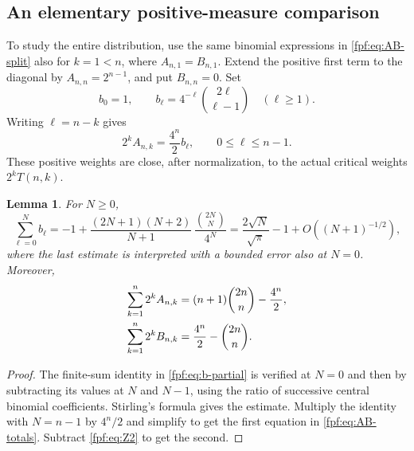 \documentclass[11pt]{article}
\numberwithin{equation}{section}
\newtheorem{lemma}[theorem]{Lemma}
\theoremstyle{definition}
\begin{document}
\subsection{An elementary positive-measure comparison}
To study the entire distribution, use the same binomial expressions in
\eqref{fpf:eq:AB-split} also for $k=1<n$, where $A_{n,1}=B_{n,1}$.
Extend the positive first term to the diagonal by
$A_{n,n}=2^{n-1}$, and put $B_{n,n}=0$. Set
\begin{equation}\label{fpf:eq:b-critical}
 b_0=1,\qquad b_\ell=4^{-\ell}\binom{2\ell}{\ell-1}\quad(\ell\ge1).
\end{equation}
Writing $\ell=n-k$ gives
\begin{equation}\label{fpf:eq:critical-positive}
 2^kA_{n,k}=\frac{4^n}{2}b_\ell,\qquad 0\le\ell\le n-1.
\end{equation}
These positive weights are close, after normalization, to the actual
critical weights $2^kT(n,k)$.

\begin{lemma}\label{fpf:lem:b-partial}
For $N\ge0$,
\begin{equation}\label{fpf:eq:b-partial}
 \sum_{\ell=0}^N b_\ell
 =-1+\frac{(2N+1)(N+2)}{N+1}\,
                    \frac{\binom{2N}{N}}{4^N}
 =\frac{2\sqrt N}{\sqrt\pi}-1+O((N+1)^{-1/2}),
\end{equation}
where the last estimate is interpreted with a bounded error also at $N=0$.
Moreover,
\begin{align}\label{fpf:eq:AB-totals}
 \sum_{k=1}^n 2^kA_{n,k}
   &=(n+1)\binom{2n}{n}-\frac{4^n}{2},\notag\\
 \sum_{k=1}^n 2^kB_{n,k}
   &=\frac{4^n}{2}-\binom{2n}{n}.
\end{align}
\end{lemma}
\begin{proof}
The finite-sum identity in \eqref{fpf:eq:b-partial} is verified at $N=0$ and
then by subtracting its values at $N$ and $N-1$, using the ratio of
successive central binomial coefficients. Stirling's formula gives the
estimate. Multiply the identity with $N=n-1$ by $4^n/2$ and simplify to get
the first equation in \eqref{fpf:eq:AB-totals}. Subtract \eqref{fpf:eq:Z2} to get
the second.
\end{proof}
\end{document}

